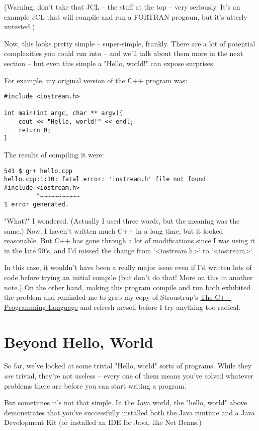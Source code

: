 \documentclass[11pt]{article}
\begin{document}
(Warning, don't take that JCL -- the stuff at the top -- very
seriously. It's an example JCL that will compile and run a FORTRAN
program, but it's utterly untested.)

Now, this looks pretty simple -- super-simple, frankly. There are a
lot of potential complexities you could run into -- and we'll talk
about them more in the next section -- but even this simple a "Hello,
world!" can expose surprises.

For example, my original version of the C++ program was:

\begin{verbatim}
#include <iostream.h>

int main(int argc, char ** argv){
    cout << "Hello, world!" << endl;
    return 0;
}
\end{verbatim}

The results of compiling it were:
\begin{verbatim}
541 $ g++ hello.cpp
hello.cpp:1:10: fatal error: 'iostream.h' file not found
#include <iostream.h>
         ^~~~~~~~~~~~
1 error generated.
\end{verbatim}

"What?" I wondered. (Actually I used three words, but the meaning was
the same.) Now, I haven't written much C++ in a long time, but it
looked reasonable.  But C++ has gone through a lot of modifications
since I was using it in the late 90's, and I'd missed the change from
`<iostream.h>` to `<iostream>`.

In this case, it wouldn't have been a really major issue even if I'd
written lots of code before trying an initial compile (but don't do
that! More on this in another note.) On the other hand, making this
program compile and run both exhibited the problem and reminded me to
grab my copy of Stroustrup's \href{https://www.amazon.com/C-Programming-Language-4th/dp/0321563840}{The C++ Programming Language} and refresh
myself before I try anything too radical.

\section{Beyond Hello, World}
\label{sec:org413e75d}

So far, we've looked at some trivial "Hello, world" sorts of
programs. While they \emph{are} trivial, they're not useless -- every one
of them means you've solved whatever problems there are before you can
start writing a program.

But sometimes it's not that simple.  In the Java world, the "hello,
world" above demonstrates that you've successfully installed both the
Java runtime and a Java Development Kit (or installed an IDE for Java,
like Net Beans.) 
\end{document}
